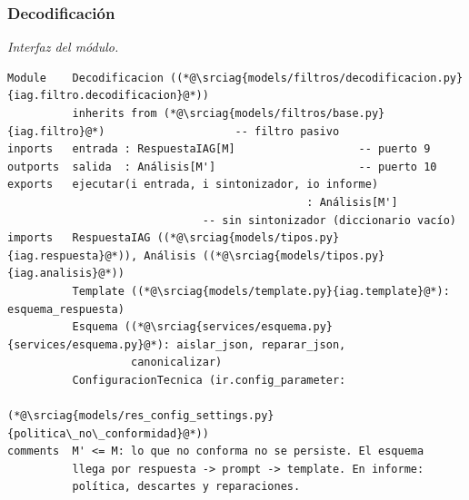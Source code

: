 \documentclass[12pt]{report}
\newcommand{\iagrepo}{https://github.com/lbassani12/noticias_iag}
\newcommand{\iagref}{bca7dba0bc76cf5533bd8df1d9a27493d498942d}
\newcommand{\srciag}[2]{\href{\iagrepo/blob/\iagref/#1}{#2}}
\begin{document}
\subsubsection{Decodificación}
\label{sec:impl-mat-decodificacion}

\noindent\begin{minipage}{\linewidth}
  \textit{Interfaz del módulo.}
  \begin{lstlisting}[style=implbloque]
Module    Decodificacion ((*@\srciag{models/filtros/decodificacion.py}{iag.filtro.decodificacion}@*))
          inherits from (*@\srciag{models/filtros/base.py}{iag.filtro}@*)                    -- filtro pasivo
inports   entrada : RespuestaIAG[M]                   -- puerto 9
outports  salida  : Análisis[M']                      -- puerto 10
exports   ejecutar(i entrada, i sintonizador, io informe)
                                              : Análisis[M']
                              -- sin sintonizador (diccionario vacío)
imports   RespuestaIAG ((*@\srciag{models/tipos.py}{iag.respuesta}@*)), Análisis ((*@\srciag{models/tipos.py}{iag.analisis}@*))
          Template ((*@\srciag{models/template.py}{iag.template}@*): esquema_respuesta)
          Esquema ((*@\srciag{services/esquema.py}{services/esquema.py}@*): aislar_json, reparar_json,
                   canonicalizar)
          ConfiguracionTecnica (ir.config_parameter:
                                (*@\srciag{models/res_config_settings.py}{politica\_no\_conformidad}@*))
comments  M' <= M: lo que no conforma no se persiste. El esquema
          llega por respuesta -> prompt -> template. En informe:
          política, descartes y reparaciones.
\end{lstlisting}
\end{minipage}
\end{document}
